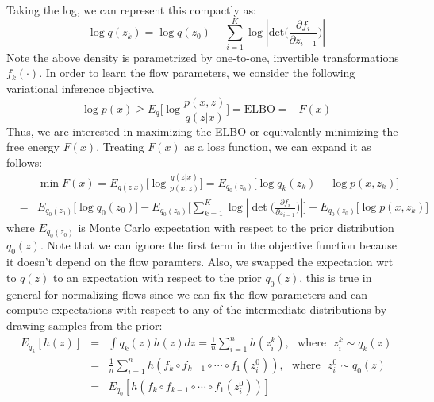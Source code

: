 Taking the log, we can represent this compactly as:
\begin{equation}
    \log q(z_k) = \log q(z_0) - \sum_{i=1}^{K}\log|\mathrm{det}\bigg(\frac{\partial f_i}{\partial z_{i-1}}\bigg)|
\end{equation}
Note the above density is parametrized by one-to-one, invertible transformations $f_k(\cdot)$. In order to learn the flow parameters, we consider the following variational inference objective.
\begin{equation}
    \log p(x) \geq E_q\big[\log \frac{p(x,z)}{q(z|x)} \big] = \mathrm{ELBO} = -F(x)
\end{equation}
Thus, we are interested in maximizing the ELBO or equivalently minimizing the free energy $F(x)$. Treating $F(x)$ as a loss function, we can expand it as follows:
\begin{eqnarray}
    &&\min F(x) = E_{q(z|x)}\bigg[\log \frac{q(z|x)}{p(x,z)} \bigg] = E_{q_0(z_0)}\bigg[\log q_k(z_k) - \log p(x, z_k)\bigg] \nonumber \\
 &=& E_{q_0(z_0)}\bigg[\log q_0(z_0)\bigg] - E_{q_0(z_0)}\bigg[\sum_{k=1}^{K}\log|\det\bigg(\frac{\partial f_i}{\partial z_{i-1}} \bigg)|\bigg] - E_{q_0(z_0)}\bigg[\log p(x, z_k)\bigg]
\end{eqnarray}
where $E_{q_0(z_0)}$ is Monte Carlo expectation with respect to the prior distribution $q_0(z)$. Note that we can ignore the first term in the objective function because it doesn't depend on the flow paramters. Also, we swapped the expectation wrt to $q(z)$ to an expectation with respect to the prior $q_0(z)$, this is true in general for normalizing flows since we can fix the flow parameters and can compute expectations with respect to any of the intermediate distributions by drawing samples from the prior:
\begin{eqnarray}
    E_{q_k}[h(z)] &=& \int q_k(z)h(z) dz = \frac{1}{n}\sum_{i=1}^{n} h(z_{i}^{k}),~~~\mathrm{where}~~~z_{i}^{k} \sim q_k(z) \\
    &=& \frac{1}{n}\sum_{i=1}^{n}h(f_k \circ f_{k-1} \circ \cdots \circ f_1(z_{i}^{0})), ~~~\mathrm{where}~~~z_{i}^{0} \sim q_0(z) \\
    &=& E_{q_0}[h(f_k \circ f_{k-1} \circ \cdots \circ f_1(z_{i}^{0}))]
\end{eqnarray}

